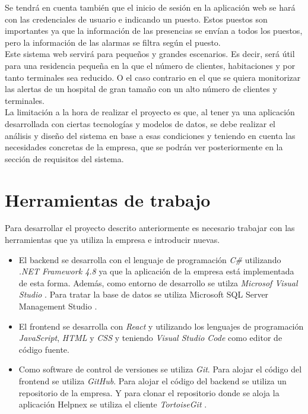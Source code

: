 Se tendrá en cuenta también que el inicio de sesión en la aplicación web se hará con las credenciales de usuario e indicando un puesto. Estos puestos son importantes ya que la información de las presencias se envían a todos los puestos, pero la información de las alarmas se filtra según el puesto.\\

Este sistema web servirá para pequeños y grandes escenarios. Es decir, será útil para una residencia pequeña en la que el número de clientes, habitaciones y por tanto terminales sea reducido. O el caso contrario en el que se quiera monitorizar las alertas de un hospital de gran tamaño con un alto número de clientes y terminales.\\


La limitación a la hora de realizar el proyecto es que, al tener ya una aplicación desarrollada con ciertas tecnologías y modelos de datos, se debe realizar el análisis y diseño del sistema en base a esas condiciones y teniendo en cuenta las necesidades concretas de la empresa, que se podrán ver posteriormente en la sección de requisitos del sistema.


\section{Herramientas de trabajo}


Para desarrollar el proyecto descrito anteriormente es necesario trabajar con las herramientas que ya utiliza la empresa e introducir nuevas.

\begin{itemize}
    \item El backend se desarrolla con el lenguaje de programación \textit{C\#} utilizando \textit{.NET Framework 4.8} \cite{net-framework} ya que la aplicación de la empresa está implementada de esta forma. Además, como entorno de desarrollo se utilza \textit{Microsof Visual Studio} \cite{vs}. Para tratar la base de datos se utiliza Microsoft SQL Server Management Studio \cite{sql-server-studio}.
    \item El frontend se desarrolla con \textit{React} \cite{react} y utilizando los lenguajes de programación \textit{JavaScript}, \textit{HTML} y \textit{CSS} y teniendo \textit{Visual Studio Code} \cite{vscode} como editor de código fuente.
    \item Como software de control de versiones se utiliza \textit{Git}. Para alojar el código del frontend se utiliza \textit{GitHub}. Para alojar el código del backend se utiliza un repositorio de la empresa. Y para clonar el repositorio donde se aloja la aplicación Helpnex se utiliza el cliente \textit{TortoiseGit} \cite{tortoise-git}.
\end{itemize}

